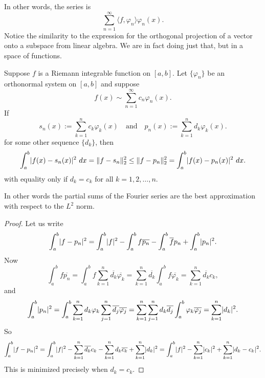 In other words, the series is
\begin{equation*}
\sum_{n=1}^\infty \langle f , \varphi_n \rangle \varphi_n(x) .
\end{equation*}
Notice the similarity to the expression for the orthogonal
projection of a vector onto a subspace from linear algebra.  We are
in fact doing just that, but in a space of functions.

\begin{thm} \label{thm:l2bestapprox}
Suppose $f$ is a Riemann integrable function on $[a,b]$.
Let $\{ \varphi_n \}$ be an orthonormal system on $[a,b]$ and
suppose
\begin{equation*}
f(x) \sim \sum_{n=1}^\infty c_n \varphi_n(x) .
\end{equation*}
If
\begin{equation*}
s_n (x) := \sum_{k=1}^n c_k \varphi_k(x)
\quad\text{and}\quad
p_n (x) := \sum_{k=1}^n d_k \varphi_k(x) .
\end{equation*}
for some other sequence $\{ d_k \}$, then
\begin{equation*}
\int_a^b \lvert {f(x)-s_n(x)} \rvert^2 ~ dx = \lVert {f-s_n} \rVert_2^2 \leq
\lVert {f-p_n} \rVert_2^2 = \int_a^b \lvert {f(x)-p_n(x)} \rvert^2 ~ dx .
\end{equation*}
with equality only if $d_k = c_k$ for all $k=1,2,\ldots,n$.
\end{thm}

In other words the partial sums of the Fourier series are the best approximation with respect to the
$L^2$ norm.

\begin{proof}
Let us write
\begin{equation*}
\int_a^b \lvert {f-p_n} \rvert^2
=
\int_a^b \lvert {f} \rvert^2
-
\int_a^b f \overline{p_n}
-
\int_a^b \overline{f} p_n
+
\int_a^b \lvert {p_n} \rvert^2 .
\end{equation*}
Now
\begin{equation*}
\int_a^b f \overline{p_n}
=
\int_a^b f \sum_{k=1}^n \overline{d_k} \overline{\varphi_k}
=
 \sum_{k=1}^n \overline{d_k} \int_a^b f \overline{\varphi_k}
=
 \sum_{k=1}^n \overline{d_k} c_k ,
\end{equation*}
and
\begin{equation*}
\int_a^b \lvert {p_n} \rvert^2
=
\int_a^b
\sum_{k=1}^n d_k \varphi_k
\sum_{j=1}^n \overline{d_j} \overline{\varphi_j}
=
\sum_{k=1}^n
\sum_{j=1}^n 
d_k
\overline{d_j} 
\int_a^b
\varphi_k
\overline{\varphi_j}
=
\sum_{k=1}^n
\lvert {d_k} \rvert^2 .
\end{equation*}
So
\begin{equation*}
\int_a^b \lvert {f-p_n} \rvert^2
=
\int_a^b \lvert {f} \rvert^2
-
\sum_{k=1}^n \overline{d_k} c_k
-
\sum_{k=1}^n d_k \overline{c_k}
+
\sum_{k=1}^n
\lvert {d_k} \rvert^2
=
\int_a^b \lvert {f} \rvert^2
-
\sum_{k=1}^n \lvert {c_k} \rvert^2
+
\sum_{k=1}^n
\lvert {d_k-c_k} \rvert^2 .
\end{equation*}
This is minimized precisely when $d_k = c_k$.
\end{proof}

